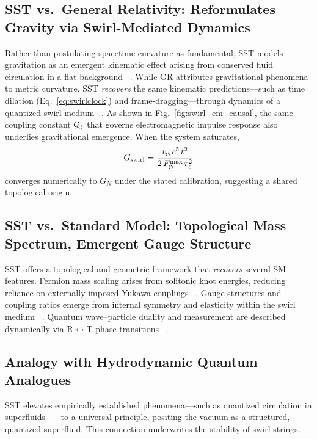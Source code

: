 \documentclass[10pt,reprint,aps,onecolumn,nofootinbib]{revtex4-2}
\newcommand{\Fmaxswirl}{F^{\max}_{\mkern-1mu\scriptscriptstyle\boldsymbol{\circlearrowleft}}}
\begin{document}
        \subsection*{SST vs.\ General Relativity: Reformulates Gravity via Swirl-Mediated Dynamics}
            Rather than postulating spacetime curvature as fundamental, SST models gravitation as an emergent kinematic effect arising from conserved fluid circulation in a flat background~ \cite{chiralSwirl}. While GR attributes gravitational phenomena to metric curvature, SST \emph{recovers} the same kinematic predictions—such as time dilation (Eq.~\ref{eq:swirlclock}) and frame-dragging—through dynamics of a quantized swirl medium~ \cite{sstCanon}. As shown in Fig.~\ref{fig:swirl_em_causal}, the same coupling constant \(\mathcal{G}_{\mkern-2mu\scriptscriptstyle\boldsymbol{\circlearrowleft}}\) that governs electromagnetic impulse response also underlies gravitational emergence. When the system saturates,
            \[
                G_{\mathrm{swirl}} = \frac{v_{\mkern-2mu\scriptscriptstyle\boldsymbol{\circlearrowleft}} \, c^5 \, t^2}{2 \, \Fmaxswirl \, r_c^2}
            \]
            converges numerically to \(G_N\) under the stated calibration, suggesting a shared topological origin.

        \subsection*{SST vs.\ Standard Model: Topological Mass Spectrum, Emergent Gauge Structure}
            SST offers a topological and geometric framework that \emph{recovers} several SM features. Fermion mass scaling arises from solitonic knot energies, reducing reliance on externally imposed Yukawa couplings~ \cite{sstLagrangian}. Gauge structures and coupling ratios emerge from internal symmetry and elasticity within the swirl medium~ \cite{sstLagrangian}. Quantum wave–particle duality and measurement are described dynamically via R$\leftrightarrow$T phase transitions~ \cite{sstCanon}.

        \subsection*{Analogy with Hydrodynamic Quantum Analogues}
            SST elevates empirically established phenomena—such as quantized circulation in superfluids~ \cite{sstCanon}—to a universal principle, positing the vacuum as a structured, quantized superfluid. This connection underwrites the stability of swirl strings.
\end{document}

